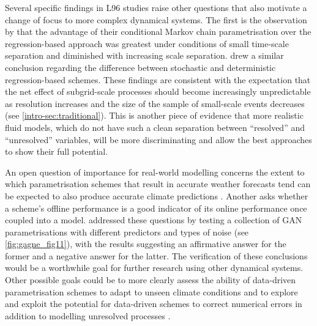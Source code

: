 \documentclass[../main.tex]{subfiles}
\begin{document}
Several specific findings in L96 studies raise other questions that also
motivate a change of focus to more complex dynamical systems. The first is the
observation by \textcite{crommelin2008} that the advantage of their conditional
Markov chain parametrisation over the regression-based approach was greatest
under conditions of small time-scale separation and diminished with increasing
scale separation. \textcite{arnold2013} drew a similar conclusion regarding the
difference between stochastic and deterministic regression-based schemes. These
findings are consistent with the expectation that the net effect of
subgrid-scale processes should become increasingly unpredictable as resolution
increases and the size of the sample of small-scale events decreases (see
\cref{intro-sec:traditional}). This is another piece of evidence that more
realistic fluid models, which do not have such a clean separation between
``resolved'' and ``unresolved'' variables, will be more discriminating and
allow the best approaches to show their full potential.

An open question of importance for real-world modelling concerns the extent to
which parametrisation schemes that result in accurate weather forecasts tend
can be expected to also produce accurate climate predictions
\parencite{christensen2019}. Another asks whether a scheme's offline
performance is a good indicator of its online performance once coupled into a
model. \textcite{gagne2020} addressed these questions by testing a collection
of GAN parametrisations with different predictors and types of noise (see
\cref{fig:gagne_fig11}), with the results suggesting an affirmative answer for
the former and a negative answer for the latter. The verification of these
conclusions would be a worthwhile goal for further research using other
dynamical systems. Other possible goals could be to more clearly assess the
ability of data-driven parametrisation schemes to adapt to unseen climate
conditions \parencite{christensen2015} and to explore and exploit the potential
for data-driven schemes to correct numerical errors in addition to modelling
unresolved processes \parencite{bhouri2023}.
\end{document}
